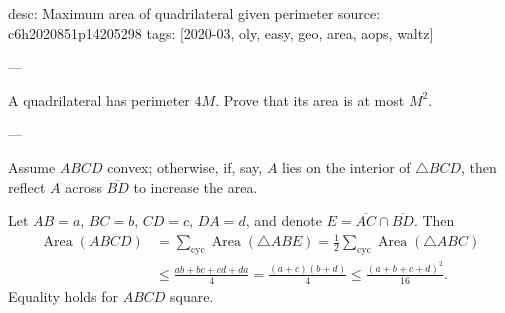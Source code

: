 desc: Maximum area of quadrilateral given perimeter
source: c6h2020851p14205298
tags: [2020-03, oly, easy, geo, area, aops, waltz]

---

A quadrilateral has perimeter $4M$. Prove that its area is at most $M^2$.

---

Assume $ABCD$ convex; otherwise, if, say, $A$ lies on the interior of $\triangle BCD$, then reflect $A$ across $\overline{BD}$ to increase the area.

Let $AB=a$, $BC=b$, $CD=c$, $DA=d$, and denote $E=\overline{AC}\cap\overline{BD}$. Then
\begin{align*}
\operatorname{Area}(ABCD)&=\sum_\mathrm{cyc}\operatorname{Area}(\triangle ABE)=\frac12\sum_\mathrm{cyc}\operatorname{Area}(\triangle ABC)\\
&\le\frac{ab+bc+cd+da}4=\frac{(a+c)(b+d)}4\le\frac{(a+b+c+d)^2}{16}.
\end{align*}
Equality holds for $ABCD$ square.
